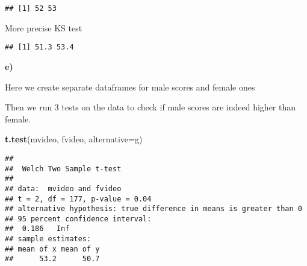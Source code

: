 \documentclass[
]{article}
\newenvironment{Shaded}{\begin{snugshade}}{\end{snugshade}}
\newcommand{\AttributeTok}[1]{\textcolor[rgb]{0.13,0.29,0.53}{#1}}
\newcommand{\ConstantTok}[1]{\textcolor[rgb]{0.56,0.35,0.01}{#1}}
\newcommand{\ControlFlowTok}[1]{\textcolor[rgb]{0.13,0.29,0.53}{\textbf{#1}}}
\newcommand{\DecValTok}[1]{\textcolor[rgb]{0.00,0.00,0.81}{#1}}
\newcommand{\FloatTok}[1]{\textcolor[rgb]{0.00,0.00,0.81}{#1}}
\newcommand{\FunctionTok}[1]{\textcolor[rgb]{0.13,0.29,0.53}{\textbf{#1}}}
\newcommand{\NormalTok}[1]{#1}
\newcommand{\OtherTok}[1]{\textcolor[rgb]{0.56,0.35,0.01}{#1}}
\newcommand{\SpecialCharTok}[1]{\textcolor[rgb]{0.81,0.36,0.00}{\textbf{#1}}}
\newcommand{\StringTok}[1]{\textcolor[rgb]{0.31,0.60,0.02}{#1}}
\begin{document}
\begin{verbatim}
## [1] 52 53
\end{verbatim}

More precise KS test

\begin{Shaded}
\end{Shaded}

\begin{verbatim}
## [1] 51.3 53.4
\end{verbatim}

\textbf{e)}

Here we create separate dataframes for male scores and female ones

\begin{Shaded}
\end{Shaded}

Then we run 3 tests on the data to check if male scores are indeed
higher than female.

\begin{Shaded}
\begin{Highlighting}[]
\FunctionTok{t.test}\NormalTok{(mvideo, fvideo, }\AttributeTok{alternative=}\StringTok{\textquotesingle{}g\textquotesingle{}}\NormalTok{)}
\end{Highlighting}
\end{Shaded}

\begin{verbatim}
## 
##  Welch Two Sample t-test
## 
## data:  mvideo and fvideo
## t = 2, df = 177, p-value = 0.04
## alternative hypothesis: true difference in means is greater than 0
## 95 percent confidence interval:
##  0.186   Inf
## sample estimates:
## mean of x mean of y 
##      53.2      50.7
\end{verbatim}
\end{document}

